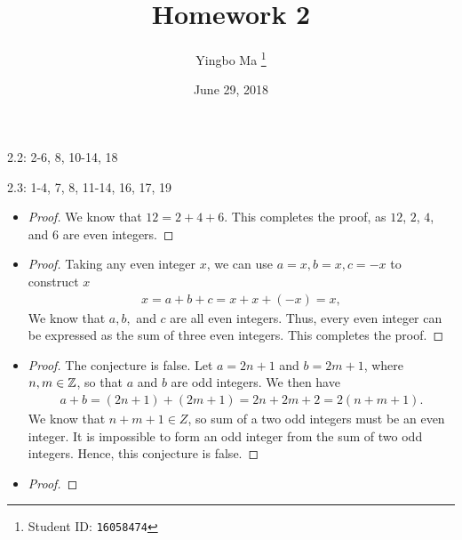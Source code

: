 \documentclass[8pt]{article}
\author{Yingbo Ma \thanks{Student ID: \tt{16058474}}}
\title{\vspace{-1.cm}Homework 2}
\date{June 29, 2018}
\begin{document}
\maketitle

2.2: 2-6, 8, 10-14, 18

2.3: 1-4, 7, 8, 11-14, 16, 17, 19

\begin{Answer}[number=2.2.2]
  \begin{itemize}
    \item
      \begin{proof}
        We know that $12 = 2+4+6$. This completes the proof, as $12$, $2$, $4$,
        and $6$ are even integers.
      \end{proof}
    \item
      \begin{proof}
        Taking any even integer $x$, we can use $a = x, b = x, c = -x$ to construct
        $x$
        \begin{align*}
          x = a + b + c = x + x + (-x) = x,
        \end{align*}
        We know that $a, b,$ and $c$ are all even integers. Thus, every even
        integer can be expressed as the sum of three even integers. This
        completes the proof.
      \end{proof}
    \item
      \begin{proof}
        The conjecture is false. Let $a=2n+1$ and $b=2m+1$, where $n,m\in
        \mathbb{Z}$, so that $a$ and $b$ are odd integers. We then have
        \begin{align*}
          a+b = (2n + 1) + (2m + 1) = 2n + 2m + 2 = 2(n+m+1).
        \end{align*}
        We know that $n+m+1\in Z$, so sum of a two odd integers must be an even
        integer. It is impossible to form an odd integer from the sum of two
        odd integers. Hence, this conjecture is false.
      \end{proof}
    \item
      \begin{proof}

\end{proof}
\end{itemize}
\end{Answer}
\end{document}
